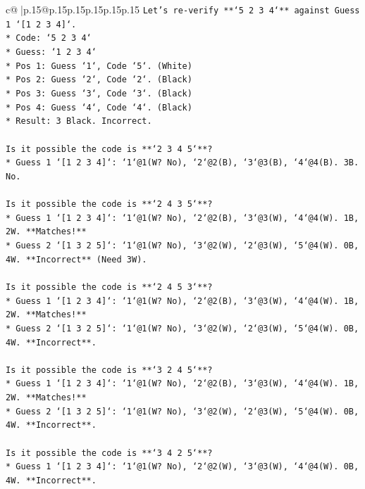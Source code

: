 \documentclass{article}
\begin{document}
{\begin{supertabular}{c@{$\;$}|p{.15\linewidth}@{}p{.15\linewidth}p{.15\linewidth}p{.15\linewidth}p{.15\linewidth}p{.15\linewidth}}
{{{\texttt{Let's re{-}verify **`5 2 3 4`** against Guess 1 `{[}1 2 3 4{]}`.} \\
\texttt{*   Code: `5 2 3 4`} \\
\texttt{*   Guess: `1 2 3 4`} \\
\texttt{*   Pos 1: Guess `1`, Code `5`. (White)} \\
\texttt{*   Pos 2: Guess `2`, Code `2`. (Black)} \\
\texttt{*   Pos 3: Guess `3`, Code `3`. (Black)} \\
\texttt{*   Pos 4: Guess `4`, Code `4`. (Black)} \\
\texttt{*   Result: 3 Black. Incorrect.} \\
\\ 
\texttt{Is it possible the code is **`2 3 4 5`**?} \\
\texttt{*   Guess 1 `{[}1 2 3 4{]}`: `1`@1(W? No), `2`@2(B), `3`@3(B), `4`@4(B). 3B. No.} \\
\\ 
\texttt{Is it possible the code is **`2 4 3 5`**?} \\
\texttt{*   Guess 1 `{[}1 2 3 4{]}`: `1`@1(W? No), `2`@2(B), `3`@3(W), `4`@4(W). 1B, 2W. **Matches!**} \\
\texttt{*   Guess 2 `{[}1 3 2 5{]}`: `1`@1(W? No), `3`@2(W), `2`@3(W), `5`@4(W). 0B, 4W. **Incorrect** (Need 3W).} \\
\\ 
\texttt{Is it possible the code is **`2 4 5 3`**?} \\
\texttt{*   Guess 1 `{[}1 2 3 4{]}`: `1`@1(W? No), `2`@2(B), `3`@3(W), `4`@4(W). 1B, 2W. **Matches!**} \\
\texttt{*   Guess 2 `{[}1 3 2 5{]}`: `1`@1(W? No), `3`@2(W), `2`@3(W), `5`@4(W). 0B, 4W. **Incorrect**.} \\
\\ 
\texttt{Is it possible the code is **`3 2 4 5`**?} \\
\texttt{*   Guess 1 `{[}1 2 3 4{]}`: `1`@1(W? No), `2`@2(B), `3`@3(W), `4`@4(W). 1B, 2W. **Matches!**} \\
\texttt{*   Guess 2 `{[}1 3 2 5{]}`: `1`@1(W? No), `3`@2(W), `2`@3(W), `5`@4(W). 0B, 4W. **Incorrect**.} \\
\\ 
\texttt{Is it possible the code is **`3 4 2 5`**?} \\
\texttt{*   Guess 1 `{[}1 2 3 4{]}`: `1`@1(W? No), `2`@2(W), `3`@3(W), `4`@4(W). 0B, 4W. **Incorrect**.} \\
\\ 
}}}
\end{supertabular}}
\end{document}
